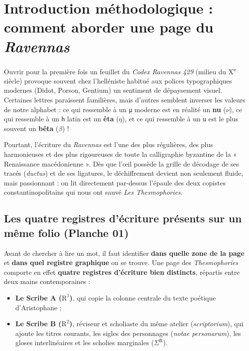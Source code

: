 \documentclass[11pt,a4paper]{article}
\begin{document}
\section{Introduction méthodologique : comment aborder une page du \textit{Ravennas}}

Ouvrir pour la première fois un feuillet du \textit{Codex Ravennas 429} (milieu du X\textsuperscript{e} siècle) provoque souvent chez l'helléniste habitué aux polices typographiques modernes (Didot, Porson, Gentium) un sentiment de dépaysement visuel. Certaines lettres paraissent familières, mais d'autres semblent inverser les valeurs de notre alphabet : ce qui ressemble à un \texttt{μ} moderne est en réalité un \textbf{nu} ($\nu$), ce qui ressemble à un \texttt{h} latin est un \textbf{êta} ($\eta$), et ce qui ressemble à un \texttt{u} est le plus souvent un \textbf{bêta} ($\beta$) !

Pourtant, l'écriture du \textit{Ravennas} est l'une des plus régulières, des plus harmonieuses et des plus rigoureuses de toute la calligraphie byzantine de la « Renaissance macédonienne ». Dès que l'œil possède la grille de décodage de ses tracés (\textit{ductus}) et de ses ligatures, le déchiffrement devient non seulement fluide, mais passionnant : on lit directement par-dessus l'épaule des deux copistes constantinopolitains qui nous ont sauvé \textit{Les Thesmophories}.

\subsection{Les quatre registres d'écriture présents sur un même folio (Planche 01)}

Avant de chercher à lire un mot, il faut identifier \textbf{dans quelle zone de la page} et \textbf{dans quel registre graphique} on se trouve. Une page des \textit{Thesmophories} comporte en effet \textbf{quatre registres d'écriture bien distincts}, répartis entre deux mains contemporaines :
\begin{itemize}
    \item \textbf{Le Scribe A ($\text{R}^1$)}, qui copie la colonne centrale du texte poétique d'Aristophane ;
    \item \textbf{Le Scribe B ($\text{R}^2$)}, réviseur et scholiaste du même atelier (\textit{scriptorium}), qui ajoute les titres courants, les sigles des personnages (\textit{notae personarum}), les gloses interlinéaires et les scholies marginales ($\Sigma^{\text{R}}$).
\end{itemize}
\end{document}
